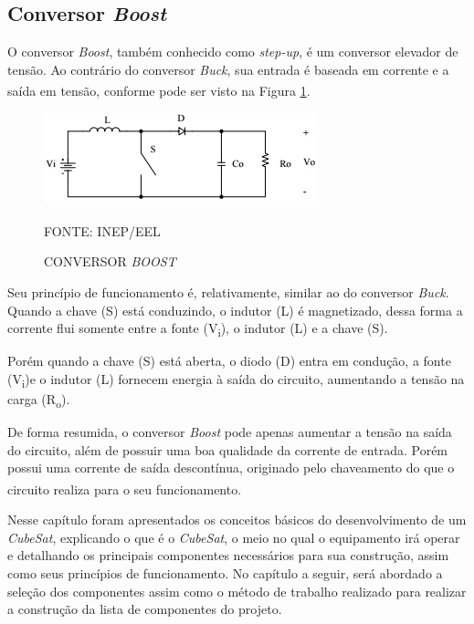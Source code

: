 \documentclass[
	12pt,				%
	openright,			%
	oneside,			%
	a4paper,			%
	english,			%
	french,				%
	spanish,			%
	brazil,				%
	oldfontcommands
	]{abntex2}
\begin{document}
\subsection[Conversor Boost]{Conversor \textit{Boost}}

	O conversor \textit{Boost}, também conhecido como \textit{step-up}, é um conversor elevador de tensão. Ao contrário do conversor \textit{Buck}, sua entrada é baseada em corrente e a saída em tensão, conforme pode ser visto na Figura \ref{Fig_boost}.\textsuperscript{\cite{inep}}

 	\begin{figure}[th]
		\caption{CONVERSOR \textit{BOOST}}
		\label{Fig_boost}
		\centering
		\includegraphics[width=0.75\linewidth]{./figs/boost}
			
		\begin{small}
			FONTE: INEP/EEL\textsuperscript{\cite{inep}}
		\end{small}		
	\end{figure}
	
	Seu princípio de funcionamento é, relativamente, similar ao do conversor \textit{Buck}. Quando a chave (S) está conduzindo, o indutor (L) é magnetizado, dessa forma a corrente flui somente entre a fonte (V\textsubscript{i}), o indutor (L) e a chave (S).
	
	Porém quando a chave (S) está aberta, o diodo (D) entra em condução, a fonte (V\textsubscript{i})e o indutor (L) fornecem energia à saída do circuito, aumentando a tensão na carga (R\textsubscript{o}).
	
	De forma resumida, o conversor \textit{Boost} pode apenas aumentar a tensão na saída do circuito, além de possuir uma boa qualidade da corrente de entrada. Porém possui uma corrente de saída descontínua, originado pelo chaveamento do que o circuito realiza para o seu funcionamento.\textsuperscript{\cite{inep}}
	
	Nesse capítulo foram apresentados os conceitos básicos do desenvolvimento de um \textit{CubeSat}, explicando o que é o \textit{CubeSat}, o meio no qual o equipamento irá operar e detalhando os principais componentes necessários para sua construção, assim como seus princípios de funcionamento. No capítulo a seguir, será abordado a seleção dos componentes assim como o método de trabalho realizado para realizar a construção da lista de componentes do projeto.
\end{document}
